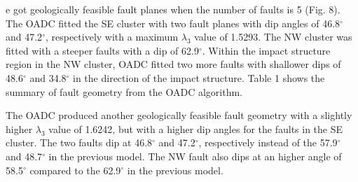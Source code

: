 \documentclass[draft]{agujournal2018}
\begin{document}


e got geologically feasible fault planes when the number of faults is 5 (Fig. 8). The OADC fitted the SE cluster with two fault planes with dip angles of 46.8$^\circ$ and 47.2$^\circ$, respectively with a maximum $\lambda_3$ value of 1.5293. The NW cluster was fitted with a steeper faults with a dip of 62.9$^\circ$. Within the impact structure region in the NW cluster, OADC fitted two more faults with shallower dips of 48.6$^\circ$ and 34.8$^\circ$ in the direction of the impact structure. Table 1 shows the summary of fault geometry from the OADC algorithm. 

The OADC produced another geologically feasible fault geometry with a slightly higher $\lambda_3$ value of 1.6242, but with a higher dip angles for the faults in the SE cluster. The two faults dip at 46.8$^\circ$ and 47.2$^\circ$, respectively instead of the 57.9$^\circ$ and 48.7$^\circ$ in the previous model. The NW fault also dips at an higher angle of 58.5$^\circ$ compared to the 62.9$^\circ$ in the previous model. 
\end{document}
